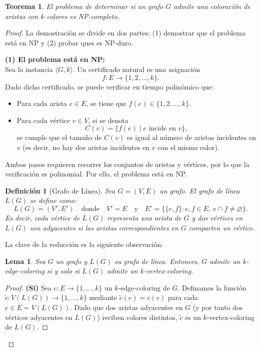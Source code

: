 \documentclass[a4paper]{article}
\newtheorem{theorem}{Teorema}
\newtheorem{definition}{Definición}
\newtheorem{lemma}{Lema}
\begin{document}
\begin{theorem}
El problema de determinar si un grafo $G$ admite una coloración de aristas con $k$ colores es NP-completo.
\end{theorem}

\begin{proof}
La demostración se divide en dos partes: (1) demostrar que el problema está en NP y (2) probar ques es NP-duro.

\textbf{(1) El problema está en NP:}\\
Sea la instancia $\langle G,k \rangle$. Un certificado natural es una asignación 
\[
f : E \to \{1,2,\dots,k\}.
\]
Dado dicho certificado, se puede verificar en tiempo polinómico que:
\begin{itemize}
    \item Para cada arista $e\in E$, se tiene que $f(e)\in \{1,2,\dots,k\}$.
    \item Para cada vértice $v\in V$, si se denota
    \[
    C(v)=\{ f(e) \mid e \text{ incide en } v \},
    \]
    se cumple que el tamaño de $C(v)$ es igual al número de aristas incidentes en $v$ (es decir, no hay dos aristas incidentes en $v$ con el mismo color).
\end{itemize}
Ambos pasos requieren recorrer los conjuntos de aristas y vértices, por lo que la verificación es polinomial. Por ello, el problema está en NP.

\begin{definition}[Grafo de Línea]
    Sea \(G=(V,E)\) un grafo. El \emph{grafo de línea} \(L(G)\) se define como:
    \[
    L(G) = (V',E') \quad \text{donde} \quad V' = E \quad \text{y} \quad E' = \big\{ \{e,f\} : e,f \in E,\ e \cap f \neq \varnothing \big\}.
    \]
    Es decir, cada vértice de \(L(G)\) representa una arista de \(G\) y dos vértices en \(L(G)\) son adyacentes si las aristas correspondientes en \(G\) comparten un vértice.
    \end{definition}

La clave de la reducción es la siguiente observación:

\begin{lemma}
Sea \(G\) un grafo y \(L(G)\) su grafo de línea. Entonces, \(G\) admite un \(k\)-edge-coloring si y solo si \(L(G)\) admite un \(k\)-vertex-coloring.
\end{lemma}

\begin{proof}
\textbf{(Si)} Sea \(c: E \to \{1,\dots,k\}\) un \(k\)-edge-coloring de \(G\). Definamos la función \(\tilde{c}: V(L(G)) \to \{1,\dots,k\}\) mediante \(\tilde{c}(e) = c(e)\) para cada \(e \in E = V(L(G))\). Dado que dos aristas adyacentes en \(G\) (y por tanto dos vértices adyacentes en \(L(G)\)) reciben colores distintos, \(\tilde{c}\) es un \(k\)-vertex-coloring de \(L(G)\).


\end{proof}
\end{proof}
\end{document}
